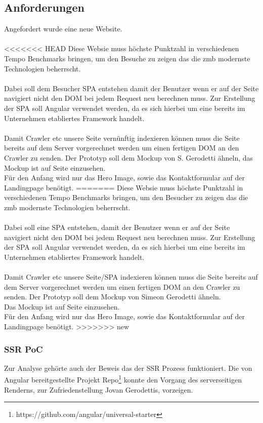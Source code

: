 \documentclass[11pt,a4paper]{article}
\begin{document}
\subsection{Anforderungen}
Angefordert wurde eine neue Website.\\\\
<<<<<<< HEAD
Diese Websie muss höchste Punktzahl in verschiedenen Tempo Benchmarks bringen, um den Besuche zu zeigen das die zmb modernste Technologien beherrscht.\\\\
Dabei soll dem Besucher \acs{SPA} entstehen damit der Benutzer wenn er auf der Seite navigiert nicht den \acs{DOM} bei jedem Request neu berechnen muss.
Zur Erstellung der SPA soll Angular verwendet werden, da es sich hierbei um eine bereits im Unternehmen etabliertes Framework handelt.\\\\
Damit Crawler etc unsere Seite vernünftig indexieren können muss die Seite bereits auf dem Server vorgerechnet werden um einen fertigen \acs{DOM} an den Crawler zu senden.
Der Prototyp soll dem Mockup von S. Gerodetti ähneln, das Mockup ist auf Seite \pageref{tbl:Übersicht der Zeitplanung} einzusehen.\\Für den Anfang wird nur das Hero Image, sowie das Kontaktformular auf der Landingpage benötigt.
=======
Diese Websie muss höchste Punktzahl in verschiedenen Tempo Benchmarks bringen, um den Besucher zu zeigen das die zmb modernste Technologien beherrscht.\\\\
Dabei soll eine \acs{SPA} entstehen, damit der Benutzer wenn er auf der Seite navigiert nicht den \acs{DOM} bei jedem Request neu berechnen muss.
Zur Erstellung der SPA soll Angular verwendet werden, da es sich hierbei um eine bereits im Unternehmen etabliertes Framework handelt.\\\\
Damit Crawler etc unsere Seite/SPA indexieren können muss die Seite bereits auf dem Server vorgerechnet werden um einen fertigen \acs{DOM} an den Crawler zu senden.
Der Prototyp soll dem Mockup von Simeon Gerodetti ähneln.\\ Das Mockup ist auf Seite \pageref{sec:mock} einzusehen.\\Für den Anfang wird nur das Hero Image, sowie das Kontaktformular auf der Landingpage benötigt.
>>>>>>> new
\subsubsection{SSR PoC}
Zur Analyse gehörte auch der Beweis das der SSR Prozess funktioniert. Die von Angular bereitgestellte Projekt Repo\footnote{https://github.com/angular/universal-starter} konnte den Vorgang des serverseitigen Renderns, zur Zufriedenstellung Jovan Gerodettis, vorzeigen.
\end{document}
